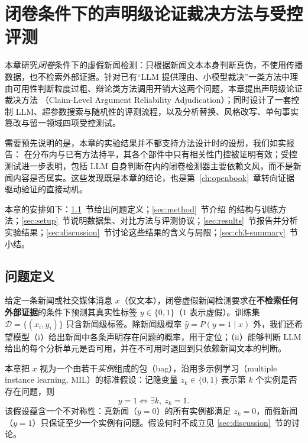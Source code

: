\chapter{闭卷条件下的声明级论证裁决方法与受控评测}\label{ch:clara}

本章研究\emph{闭卷}条件下的虚假新闻检测：只根据新闻文本本身判断真伪，不使用传播数据，也不检索外部证据。针对已有“LLM 提供理由、小模型裁决”一类方法中理由可用性判断粒度过粗、辩论类方法调用开销大这两个问题，本章提出声明级论证裁决方法 \method{}（Claim-Level Argument Reliability Adjudication）；同时设计了一套控制 LLM、超参数搜索与随机性的评测流程，以及分析替换、风格改写、单句事实篡改与留一领域四项受控测试。

需要预先说明的是，本章的实验结果并不都支持方法设计时的设想，我们如实报告：\method{} 在分布内与已有方法持平，其各个部件中只有相关性门控被证明有效；受控测试进一步表明，包括 LLM 自身判断在内的闭卷检测器主要依赖文风，而不是新闻内容是否属实。这些发现既是本章的结论，也是第~\ref{ch:openbook}~章转向证据驱动验证的直接动机。

本章的安排如下：\ref{sec:problem}~节给出问题定义；\ref{sec:method}~节介绍 \method{} 的结构与训练方法；\ref{sec:setup}~节说明数据集、对比方法与评测协议；\ref{sec:results}~节报告并分析实验结果；\ref{sec:discussion}~节讨论这些结果的含义与局限；\ref{sec:ch3-summary}~节小结。

\section{问题定义}\label{sec:problem}

给定一条新闻或社交媒体消息 $x$（仅文本），闭卷虚假新闻检测要求在\textbf{不检索任何外部证据}的条件下预测其真实性标签 $y\in\{0,1\}$（$1$ 表示虚假）。训练集 $\mathcal{D}=\{(x_i,y_i)\}$ 只含新闻级标签。除新闻级概率 $\hat y=P(y{=}1\mid x)$ 外，我们还希望模型（i）给出新闻中各条声明存在问题的概率，用于定位；（ii）能够判断 LLM 给出的每个分析单元是否可用，并在不可用时退回到只依赖新闻文本的判断。

本章把 $x$ 视为一个由若干\emph{实例}组成的包（bag），沿用多示例学习（multiple instance learning, MIL）的标准假设\citep{dietterich1997solving,carbonneau2018mil}：记隐变量 $z_k\in\{0,1\}$ 表示第 $k$ 个实例是否存在问题，则
\begin{equation}
y=1 \iff \exists k,\ z_k=1 .\label{eq:mil}
\end{equation}
该假设蕴含一个不对称性：真新闻（$y{=}0$）的所有实例都满足 $z_k{=}0$，而假新闻（$y{=}1$）只保证至少一个实例有问题。假设何时不成立见 \ref{sec:discussion}~节的讨论。

